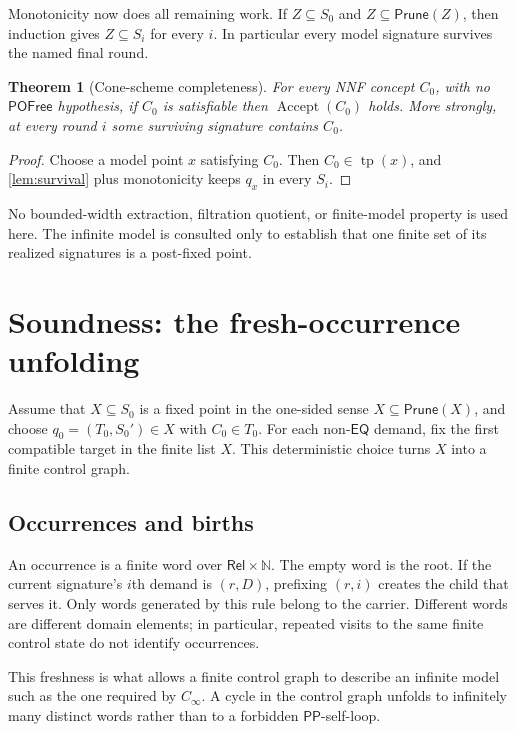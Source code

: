 \documentclass[11pt]{article}
\theoremstyle{plain}
\newtheorem{theorem}{Theorem}[section]
\theoremstyle{definition}
\theoremstyle{remark}
\newcommand{\Rel}{\ensuremath{\mathsf{Rel}}}
\newcommand{\EQ}{\ensuremath{\mathsf{EQ}}}
\newcommand{\PP}{\ensuremath{\mathsf{PP}}}
\newcommand{\Prune}{\ensuremath{\mathsf{Prune}}}
\newcommand{\POFree}{\ensuremath{\mathsf{POFree}}}
\begin{document}
Monotonicity now does all remaining work.  If $Z\subseteq S_0$ and
$Z\subseteq\Prune(Z)$, then induction gives $Z\subseteq S_i$ for every $i$.
In particular every model signature survives the named final round.

\begin{theorem}[Cone-scheme completeness]
\label{thm:complete}
For every NNF concept $C_0$, with no $\POFree$ hypothesis, if $C_0$ is
satisfiable then $\operatorname{Accept}(C_0)$ holds.  More strongly, at every
round $i$ some surviving signature contains $C_0$.
\end{theorem}

\begin{proof}
Choose a model point $x$ satisfying $C_0$.  Then $C_0\in\operatorname{tp}(x)$,
and \cref{lem:survival} plus monotonicity keeps $q_x$ in every $S_i$.
\end{proof}

No bounded-width extraction, filtration quotient, or finite-model property is
used here.  The infinite model is consulted only to establish that one finite
set of its realized signatures is a post-fixed point.

\section{Soundness: the fresh-occurrence unfolding}
\label{sec:soundness}

Assume that $X\subseteq S_0$ is a fixed point in the one-sided sense
$X\subseteq\Prune(X)$, and choose $q_0=(T_0,S_0')\in X$ with $C_0\in T_0$.
For each non-$\EQ$ demand, fix the first compatible target in the finite list
$X$.  This deterministic choice turns $X$ into a finite control graph.

\subsection{Occurrences and births}

An occurrence is a finite word over $\Rel\times\mathbb N$.  The empty word is
the root.  If the current signature's $i$th demand is $(r,D)$, prefixing
$(r,i)$ creates the child that serves it.  Only words generated by this rule
belong to the carrier.  Different words are different domain elements; in
particular, repeated visits to the same finite control state do not identify
occurrences.

This freshness is what allows a finite control graph to describe an infinite
model such as the one required by $C_{\infty}$.  A cycle in the control graph
unfolds to infinitely many distinct words rather than to a forbidden
$\PP$-self-loop.
\end{document}
